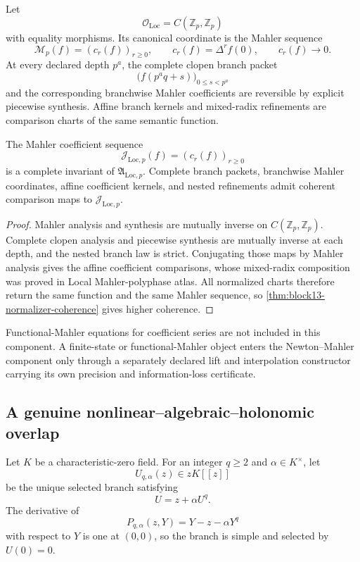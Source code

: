 Let
\[
 \mathcal O_{\mathrm{Loc}}
 =C(\mathbb Z_p,\mathbb Z_p)
\]
with equality morphisms.  Its canonical coordinate is the Mahler sequence
\[
 \mathcal M_p(f)
 =
 (c_r(f))_{r\ge0},
 \qquad
 c_r(f)=\Delta^r f(0),
 \qquad
 c_r(f)\longrightarrow0.
\]
At every declared depth \(p^a\), the complete clopen branch packet
\[
 \bigl(f(p^aq+s)\bigr)_{0\le s<p^a}
\]
and the corresponding branchwise Mahler coefficients are reversible by explicit piecewise synthesis.  Affine branch kernels and mixed-radix refinements are comparison charts of the same semantic function.

\begin{theorem}
\label{thm:block13-local-comparison}
The Mahler coefficient sequence
\[
 \mathcal J_{\mathrm{Loc},p}(f)
 =
 (c_r(f))_{r\ge0}
\]
is a complete invariant of \(\mathfrak A_{\mathrm{Loc},p}\).  Complete branch packets, branchwise Mahler coordinates, affine coefficient kernels, and nested refinements admit coherent comparison maps to \(\mathcal J_{\mathrm{Loc},p}\).
\end{theorem}

\begin{proof}
Mahler analysis and synthesis are mutually inverse on \(C(\mathbb Z_p,\mathbb Z_p)\).  Complete clopen analysis and piecewise synthesis are mutually inverse at each depth, and the nested branch law is strict.  Conjugating those maps by Mahler analysis gives the affine coefficient comparisons, whose mixed-radix composition was proved in Local Mahler-polyphase atlas.  All normalized charts therefore return the same function and the same Mahler sequence, so \cref{thm:block13-normalizer-coherence} gives higher coherence.
\end{proof}

Functional-Mahler equations for coefficient series are not included in this component.  A finite-state or functional-Mahler object enters the Newton--Mahler component only through a separately declared lift and interpolation constructor carrying its own precision and information-loss certificate.

\subsection{A genuine nonlinear--algebraic--holonomic overlap}
\label{subsec:block13-fuss}

Let \(K\) be a characteristic-zero field.  For an integer \(q\geq2\) and \(\alpha\in K^\times\), let
\[
 U_{q,\alpha}(z)\in zK[[z]]
\]
be the unique selected branch satisfying
\begin{equation}
 U=z+\alpha U^q.
 \label{eq:block13-fuss-tree}
\end{equation}
The derivative of
\[
 P_{q,\alpha}(z,Y)=Y-z-\alpha Y^q
\]
with respect to \(Y\) is one at \((0,0)\), so the branch is simple and selected by \(U(0)=0\).

